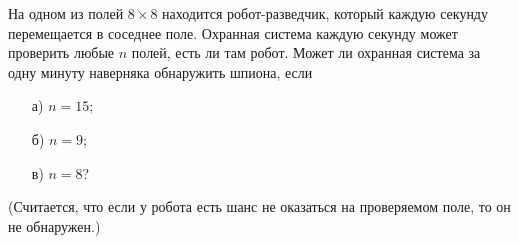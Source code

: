 
На одном из полей $8\times8$ находится робот-разведчик, который каждую секунду перемещается в соседнее поле. Охранная 
система каждую секунду может проверить любые $n$ полей, есть ли там робот. Может ли охранная система за одну минуту наверняка обнаружить шпиона, если
\begin{enumerate}
    \item [а)] $n=15$;

    \item [б)] $n=9$;

    \item [в)] $n=8$?
\end{enumerate}
(Считается, что если у робота есть шанс не оказаться на проверяемом поле, то он не обнаружен.)